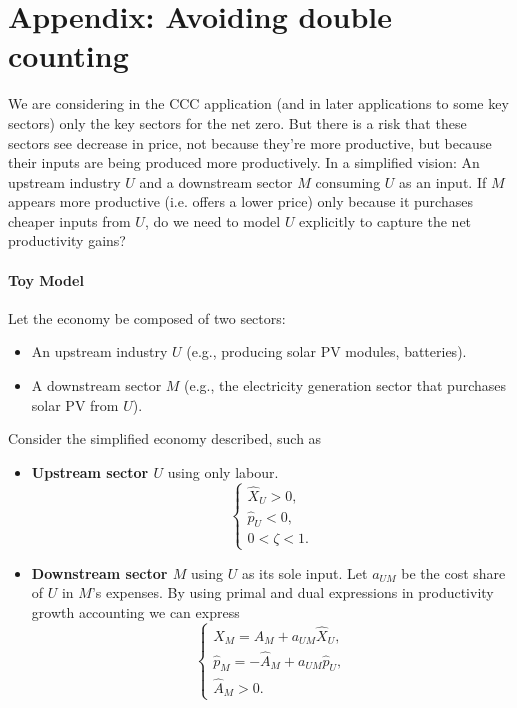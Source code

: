 \documentclass[11pt]{article}
\begin{document}
\newpage
\section{Appendix: Avoiding double counting}

We are considering in the CCC application (and in later applications to some key sectors) only the key sectors for the net zero. 
But there is a risk that these sectors see decrease in price, not because they're more productive, but because their inputs are being produced more productively.
In a simplified vision:  An upstream industry $U$ and a downstream sector $M$ consuming $U$ as an input. If $M$ appears more productive (i.e. offers a lower price) only because it purchases cheaper inputs from $U$, do we need to model $U$ explicitly to capture the net productivity gains? 


\paragraph{Toy Model\\}


Let the economy be composed of two sectors:
\begin{itemize}
    \item An upstream industry $U$ (e.g., producing solar PV modules, batteries).
    \item A downstream sector $M$ (e.g., the electricity generation sector that purchases solar PV from $U$).
\end{itemize}

Consider the simplified economy described, such as
\begin{itemize}
    \item \textbf{Upstream sector $U$} using only labour. 
    \[
    \begin{cases}
    \hat{X}_U > 0,\\
    \hat{p}_U < 0,\\
    0 < \zeta < 1.
    \end{cases}
    \]
    \item \textbf{Downstream sector $M$} using $U$ as its sole input. Let $a_{UM}$ be the cost share of $U$ in $M$'s expenses.  By using primal and dual expressions in productivity growth accounting we can express
    \[
    \begin{cases}
    \hat{X}_M = \hat{A}_M+a_{UM}  \hat{X}_U,\\
    \hat{p}_M = -\hat{A}_M+a_{UM}  \hat{p}_U,\\
    \hat{A}_M > 0.
    \end{cases}
    \]
\end{itemize}
\end{document}
